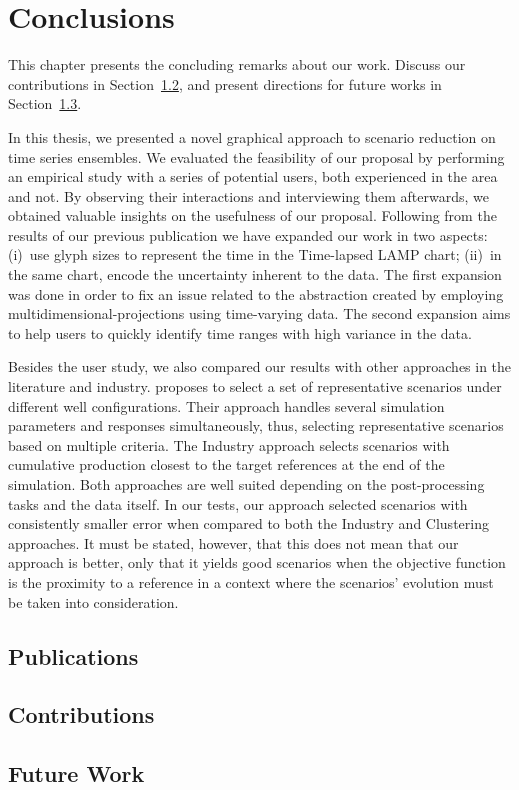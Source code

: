 \newpage

\chapter{Conclusions}
\label{chap:conclusions}

This chapter presents the concluding remarks about our work. Discuss our contributions in Section~\ref{sec:contributions}, and present directions for future works in Section~\ref{sec:future-work}.

In this thesis, we presented a novel graphical approach to scenario reduction on time series ensembles. We evaluated the feasibility of our proposal by performing an empirical study with a series of potential users, both experienced in the area and not. By observing their interactions and interviewing them afterwards, we obtained valuable insights on the usefulness of our proposal. Following from the results of our previous publication we have expanded our work in two aspects: (i)~use glyph sizes to represent the time in the Time-lapsed LAMP chart; (ii)~in the same chart, encode the uncertainty inherent to the data. The first expansion was done in order to fix an issue related to the abstraction created by employing multidimensional-projections using time-varying data. The second expansion aims to help users to quickly identify time ranges with high variance in the data.

Besides the user study, we also compared our results with other approaches in the literature and industry. proposes to select a set of representative scenarios under different well configurations. Their approach handles several simulation parameters and responses simultaneously, thus, selecting representative scenarios based on multiple criteria. The Industry approach selects scenarios with cumulative production closest to the target references at the end of the simulation. Both approaches are well suited depending on the post-processing tasks and the data itself. In our tests, our approach selected scenarios with consistently smaller error when compared to both the Industry and Clustering approaches. It must be stated, however, that this does not mean that our approach is better, only that it yields good scenarios when the objective function is the proximity to a reference in a context where the scenarios' evolution must be taken into consideration.


\section{Publications}
\label{sec:publications}

\section{Contributions}
\label{sec:contributions}

\section{Future Work}
\label{sec:future-work}

